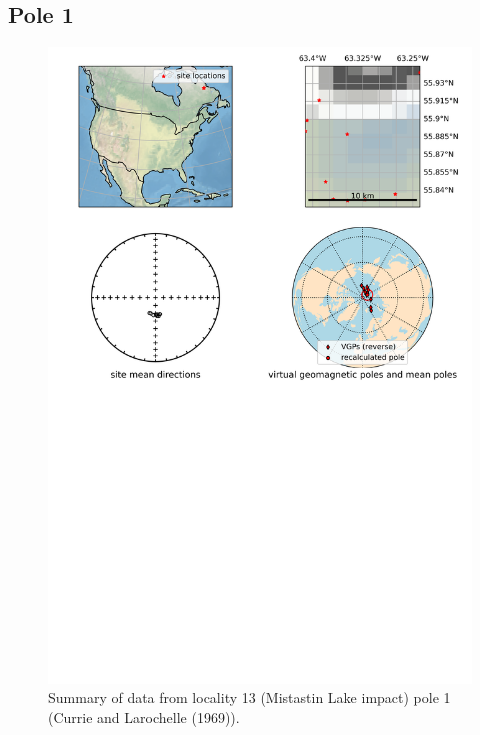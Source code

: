 \subsection{Pole 1}


\begin{figure}[H]
\centering
\includegraphics[width=5 in]{./13/1/pole_summary.png}
\caption{Summary of data from locality 13 (Mistastin Lake impact) pole 1 (Currie and Larochelle (1969)).}
\end{figure}

